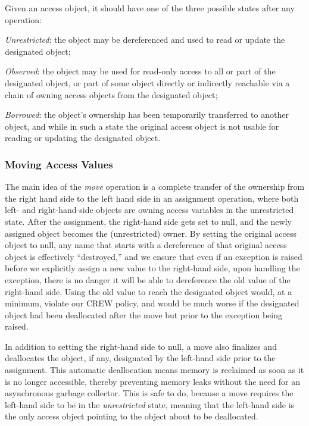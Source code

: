 \documentclass{llncs}
\begin{document}
Given an access object, it should have one of the three possible states after any operation:

\begin{compactitem} 
  \item \textit {Unrestricted}: the object may be dereferenced and used to read or update the designated object;
  \item \textit {Observed}: the object may be used for read-only access to all or part of the designated object, or part of some object directly or indirectly reachable via a chain of owning access objects from the designated object;
  \item \textit {Borrowed}: the object's ownership has been temporarily transferred to another object,  and while in such a state the original access object is not usable for reading or updating the designated object.
\end{compactitem}


\subsubsection{Moving Access Values}
\label{sec:moving}

The main idea of the \textit{move} operation is a complete transfer of the ownership from the right hand side to the left hand side in an assignment operation, where both left- and right-hand-side objects are owning access variables in the unrestricted state.
After the assignment, the right-hand side gets set to null, and the newly assigned object becomes the (unrestricted) owner. By setting the original access object to null, any name that starts with a dereference of
that original access object is effectively ``destroyed,'' and we ensure that even if an exception is raised before we explicitly assign a new value to the right-hand side, upon handling the exception, there is no danger it will
be able to dereference the old value of the right-hand side.  Using the old value to reach the designated object would, at a minimum, violate our CREW policy, and would be much worse if the designated object had been deallocated after the move but prior to the exception being raised.

\smallskip
In addition to setting the right-hand side to null, a move also finalizes and deallocates the object, if any, designated by the
left-hand side prior to the assignment.  This automatic deallocation means memory is reclaimed as soon as it is
no longer accessible, thereby preventing memory leaks without the need for an asynchronous garbage collector.
This is safe to do, because a move requires the left-hand side to be in the \textit{unrestricted} state, meaning that
the left-hand side is the only access object pointing to the object about to be deallocated.
\end{document}
